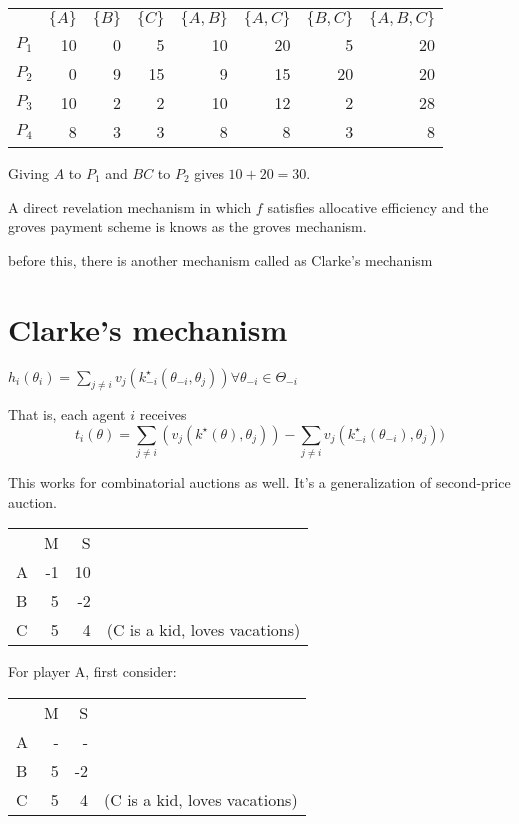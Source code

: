 \documentclass[11pt]{book}
\begin{document}
\begin{tabular}{l r r r r r r r}
    & $\{ A \}$  & $\{ B \}$   & $\{ C \}$  &  $\{ A, B \}$ & $\{ A, C \}$ & $\{ B, C  \}$ & $\{  A, B, C \}$ \\
$P_1$  & 10 & 0   & 5  &  10  &  20 &   5  &  20 \\
$P_2$  & 0  & 9   & 15  &  9  &  15 &  20  &  20 \\
$P_3$  & 10 &  2   & 2  &  10  &  12 &  2  &   28 \\
$P_4$  & 8  &  3   & 3  &  8  &   8 &   3  &    8
\end{tabular}


Giving $A$ to $P_1$ and $BC$ to $P_2$ gives $10 + 20 = 30$.


A direct revelation mechanism in which $f$ satisfies allocative efficiency
and the groves payment scheme is knows as the groves mechanism.

before this, there is another mechanism called as Clarke's mechanism

\section{Clarke's mechanism}

$h_i(\theta_i) = \sum_{j \neq i} v_j(k_{-i}^\star(\theta_{-i}, \theta_j)) \forall \theta_{-i} \in \Theta_{-i}$

That is, each agent $i$ receives
$$
t_i(\theta) = \sum_{j \neq i}(v_j(k^\star(\theta), \theta_j)) - \sum_{j \neq i} v_j(k^\star_{-i}(\theta_{-i}), \theta_j))
$$

This works for combinatorial auctions as well. It's a generalization
of second-price auction.

\begin{tabular}{l r r l}
  & M & S & \\
A &-1  &10 &  \\
B & 5  &-2 & \\
C & 5 & 4 &  (C is a kid, loves vacations) \\
\end{tabular}

For player A, first consider:

\begin{tabular}{l r r l}
   & M  & S & \\
A  & -  & -  & \\
B  & 5  & -2 & \\
C  & 5  & 4  & (C is a kid, loves vacations) \\
\end{tabular}
\end{document}
